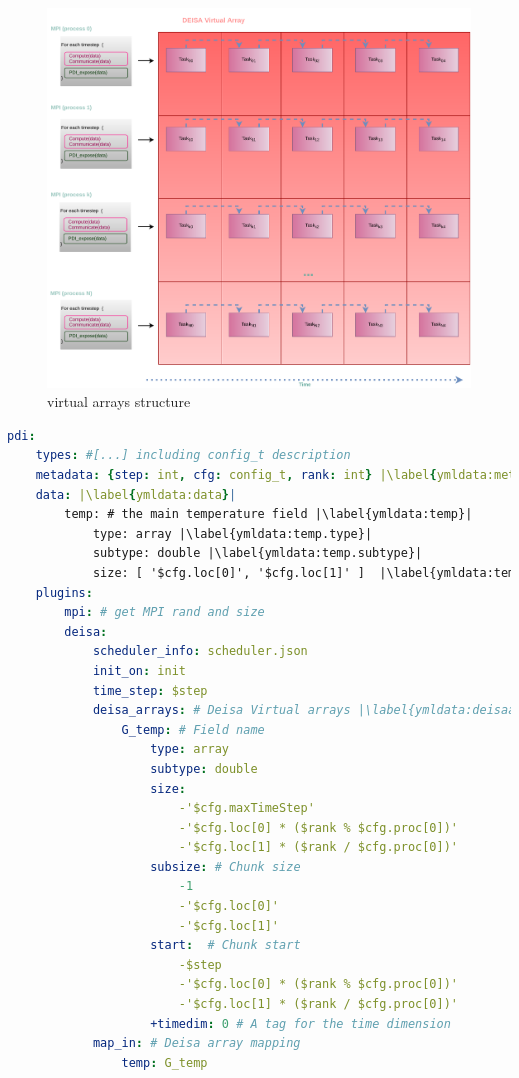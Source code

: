 \begin{figure}[h!]\centering
\includegraphics[scale=0.4]{figures/Darray.pdf}
\caption{\deisa virtual arrays structure}
\label{figdeisarray}
\end{figure}

\begin{lstlisting}[float=h!, label=ymldata, language=yaml, caption=Data description in \pdi \deisa YAML file]
pdi:
    types: #[...] including config_t description
    metadata: {step: int, cfg: config_t, rank: int} |\label{ymldata:metadata}|
    data: |\label{ymldata:data}|
        temp: # the main temperature field |\label{ymldata:temp}|
            type: array |\label{ymldata:temp.type}|
            subtype: double |\label{ymldata:temp.subtype}|
            size: [ '$cfg.loc[0]', '$cfg.loc[1]' ]  |\label{ymldata:temp.size}|
    plugins:
        mpi: # get MPI rand and size
        deisa:
            scheduler_info: scheduler.json
            init_on: init 
            time_step: $step 
            deisa_arrays: # Deisa Virtual arrays |\label{ymldata:deisaarra}|
                G_temp: # Field name
                    type: array
                    subtype: double
                    size:
                        -'$cfg.maxTimeStep'
                        -'$cfg.loc[0] * ($rank % $cfg.proc[0])'
                        -'$cfg.loc[1] * ($rank / $cfg.proc[0])'
                    subsize: # Chunk size
                        -1
                        -'$cfg.loc[0]'
                        -'$cfg.loc[1]'
                    start:  # Chunk start
                        -$step
                        -'$cfg.loc[0] * ($rank % $cfg.proc[0])'
                        -'$cfg.loc[1] * ($rank / $cfg.proc[0])'
                    +timedim: 0 # A tag for the time dimension
            map_in: # Deisa array mapping
                temp: G_temp    
\end{lstlisting}


